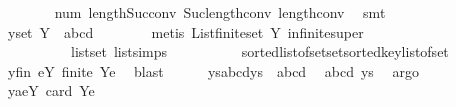 \begin{isabellebody}
\ \ \ \ \ \ \isamarkupfalse%
\ num{\isacharunderscore}{\kern0pt}{}\ length{\isacharunderscore}{\kern0pt}Suc{\isacharunderscore}{\kern0pt}conv\ Suc{\isacharunderscore}{\kern0pt}length{\isacharunderscore}{\kern0pt}conv\ length{\isacharunderscore}{\kern0pt}{}{\isacharunderscore}{\kern0pt}conv\ \isamarkupfalse%
\ smt\isanewline
\ \ \ \ \isamarkupfalse%
\ y{\isacharunderscore}{\kern0pt}set{\isacharcolon}{\kern0pt}\ {\isachardoublequoteopen}Y\ {\isacharequal}{\kern0pt}\ {\isacharbraceleft}{\kern0pt}a{\isacharcomma}{\kern0pt}b{\isacharcomma}{\kern0pt}c{\isacharcomma}{\kern0pt}d{\isacharbraceright}{\kern0pt}{\isachardoublequoteclose}\isanewline
\ \ \ \ \ \ \isamarkupfalse%
\ {\isacharparenleft}{\kern0pt}metis\ List{\isachardot}{\kern0pt}finite{\isacharunderscore}{\kern0pt}set\ Y{\isacharparenleft}{\kern0pt}{}{\isacharparenright}{\kern0pt}\ infinite{\isacharunderscore}{\kern0pt}super\isanewline
\ \ \ \ \ \ \ \ \ \ list{\isachardot}{\kern0pt}set{\isacharparenleft}{\kern0pt}{}{\isacharparenright}{\kern0pt}\ list{\isachardot}{\kern0pt}simps{\isacharparenleft}{\kern0pt}{}{}{\isacharparenright}{\kern0pt}\isanewline
\ \ \ \ \ \ \ \ \ \ sorted{\isacharunderscore}{\kern0pt}list{\isacharunderscore}{\kern0pt}of{\isacharunderscore}{\kern0pt}set{\isachardot}{\kern0pt}set{\isacharunderscore}{\kern0pt}sorted{\isacharunderscore}{\kern0pt}key{\isacharunderscore}{\kern0pt}list{\isacharunderscore}{\kern0pt}of{\isacharunderscore}{\kern0pt}set{\isacharparenright}{\kern0pt}\isanewline
\ \ \ \ \isamarkupfalse%
\ y{\isacharunderscore}{\kern0pt}fin{\isacharcolon}{\kern0pt}\ {\isachardoublequoteopen}{\isasymforall}e{\isasymin}Y{\isachardot}{\kern0pt}\ finite\ {\isacharparenleft}{\kern0pt}Y{\isacharminus}{\kern0pt}{\isacharbraceleft}{\kern0pt}e{\isacharbraceright}{\kern0pt}{\isacharparenright}{\kern0pt}{\isachardoublequoteclose}\ \isamarkupfalse%
\ blast\isanewline
\ \ \ \ \isamarkupfalse%
\ ys{\isacharunderscore}{\kern0pt}abcd{\isacharcolon}{\kern0pt}{\isachardoublequoteopen}ys\ {\isacharequal}{\kern0pt}\ {\isacharbrackleft}{\kern0pt}a{\isacharcomma}{\kern0pt}b{\isacharcomma}{\kern0pt}c{\isacharcomma}{\kern0pt}d{\isacharbrackright}{\kern0pt}{\isachardoublequoteclose}\ \isamarkupfalse%
\ abcd\ ys\ \isamarkupfalse%
\ argo\isanewline
\ \ \ \ \isamarkupfalse%
\ y{\isacharunderscore}{\kern0pt}a{\isacharcolon}{\kern0pt}{\isachardoublequoteopen}{\isasymforall}e{\isasymin}Y{\isachardot}{\kern0pt}\ card\ {\isacharparenleft}{\kern0pt}Y{\isacharminus}{\kern0pt}{\isacharbraceleft}{\kern0pt}e{\isacharbraceright}{\kern0pt}{\isacharparenright}{\kern0pt}\ {\isacharequal}{\kern0pt}\ {}{\isachardoublequoteclose}\ \isamarkupfalse%

\end{isabellebody}
